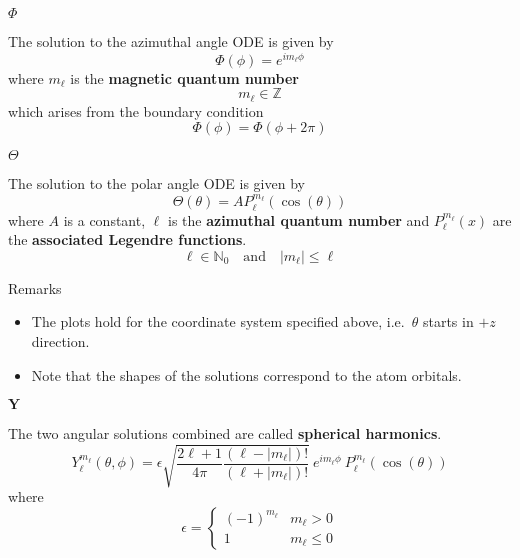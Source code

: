 \newpar{}
 $\Phi$

The solution to the azimuthal angle ODE is given by
\begin{equation*}
    \Phi(\phi)=e^{i m_\ell \phi}
\end{equation*}
where $m_\ell$ is the \textbf{magnetic quantum number}
\begin{equation*}
    m_\ell \in \mathbb{Z}
\end{equation*}
which arises from the boundary condition
\begin{equation*}
    \Phi(\phi)=\Phi(\phi+2\pi)
\end{equation*}

\newpar{}
 $\Theta$

The solution to the polar angle ODE is given by
\begin{equation*}
    \Theta(\theta) = A P_{\ell}^{m_\ell}(\cos(\theta))
\end{equation*}
where $A$ is a constant, $\ell$ is the \textbf{azimuthal quantum number} and $P_{\ell}^{m_\ell}(x)$ are the \textbf{associated Legendre functions}.
\begin{equation*}
    \ell \in \mathbb{N}_0 \quad \text{and} \quad |m_\ell| \leq \ell
\end{equation*}



Remarks
\begin{itemize}
    \item The plots hold for the coordinate system specified above, i.e.\ $\theta$ starts in $+z$ direction.
    \item Note that the shapes of the solutions correspond to the atom orbitals.
\end{itemize}

\newpar{}
 $\mathbf{Y}$

The two angular solutions combined are called \textbf{spherical harmonics}.
\begin{equation*}
    Y_{\ell}^{m_\ell}(\theta, \phi) = \epsilon\sqrt{\frac{2\ell+1}{4\pi}\frac{(\ell-|m_\ell|)!}{(\ell+|m_\ell|)!}}\:e^{im_\ell\phi}\:P_{\ell}^{m_\ell}(\cos(\theta))
\end{equation*}
where
\begin{equation*}
    \epsilon = \begin{cases}
        {(-1)}^{m_\ell} & m_\ell > 0    \\
        1               & m_\ell \leq 0
    \end{cases}
\end{equation*}


